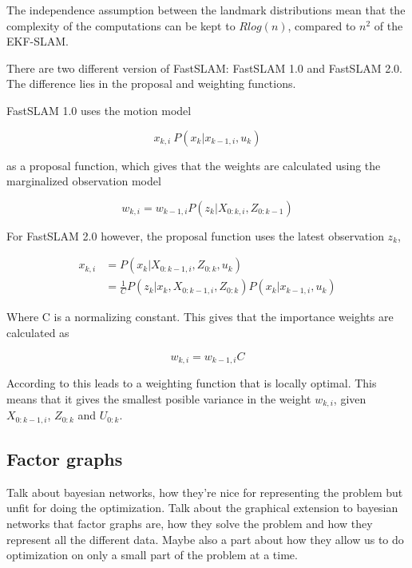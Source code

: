 The independence assumption between the landmark distributions mean that the complexity of the computations can be kept to $Rlog(n)$, compared to $n^2$ of the EKF-SLAM. 

There are two different version of FastSLAM: FastSLAM 1.0\cite{FastSLAM1} and FastSLAM 2.0\cite{FastSLAM2}. The difference lies in the proposal and weighting functions. 

FastSLAM 1.0 uses the motion model 

\begin{equation}
    x_{k,i} ~ P(x_k|x_{k-1,i},u_k)
\end{equation}

as a proposal function, which gives that the weights are calculated using the marginalized observation model

\begin{equation}
    w_{k,i} = w_{k-1,i}P(z_k|X_{0:k,i},Z_{0:k-1})
\end{equation}

For FastSLAM 2.0 however, the proposal function uses the latest observation $z_k$,

\begin{align}
    x_{k,i} &= P(x_k|X_{0:k-1,i},Z_{0:k},u_k) \\
    &= \frac{1}{C}P(z_k|x_k,X_{0:k-1,i},Z_{0:k})P(x_k|x_{k-1,i},u_k)
\end{align}

Where C is a normalizing constant. This gives that the importance weights are calculated as

\begin{equation}
    w_{k,i} = w_{k-1,i}C
\end{equation}

According to \cite{SLAMIntro} this leads to a weighting function that is locally optimal. This means that it gives the smallest posible variance in the weight $w_{k,i}$, given $X_{0:k-1,i}$, $Z_{0:k}$ and $U_{0:k}$.

\subsection{Factor graphs}

Talk about bayesian networks, how they're nice for representing the problem but unfit for doing the optimization. Talk about the graphical extension to bayesian networks that factor graphs are, how they solve the problem and how they represent all the different data. Maybe also a part about how they allow us to do optimization on only a small part of the problem at a time. 

